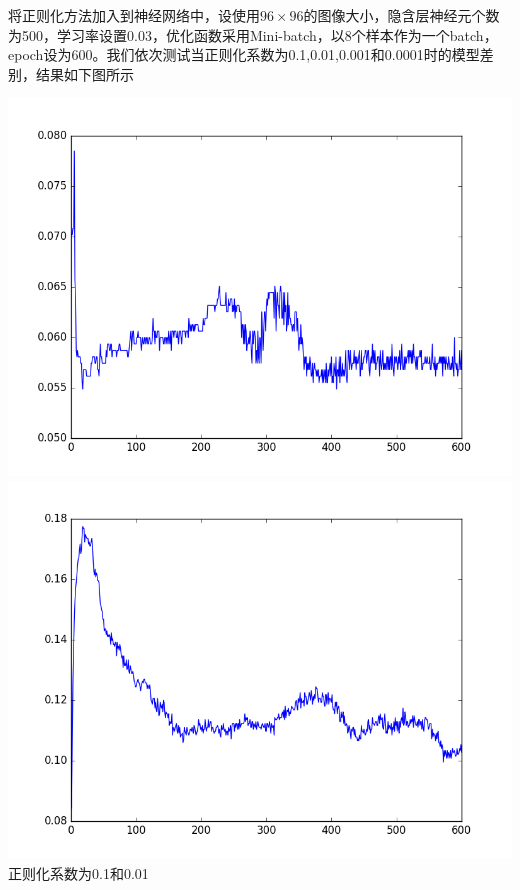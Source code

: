 将正则化方法加入到神经网络中，设使用$96\times 96$的图像大小，隐含层神经元个数为500，学习率设置0.03，优化函数采用Mini-batch，以8个样本作为一个batch，epoch设为600。我们依次测试当正则化系数为0.1,0.01,0.001和0.0001时的模型差别，结果如下图所示
\begin{center}
\includegraphics[scale=0.4]{../figures/Log/BP_new7/BP_new7_acc.png} 
\includegraphics[scale=0.4]{../figures/Log/BP_new9/BP_new9_acc.png} \\
正则化系数为0.1和0.01
\end{center}
